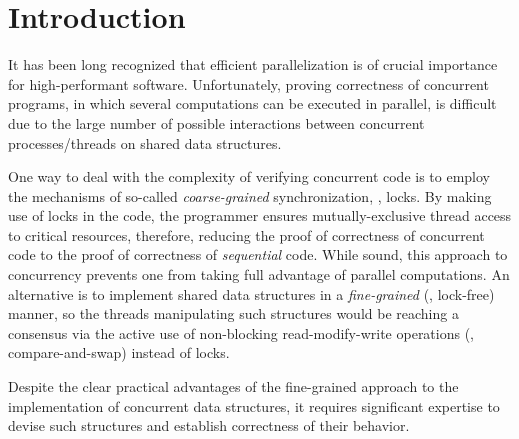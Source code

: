 \section{Introduction}
\label{sec:intro}

It has been long recognized that efficient parallelization is of
crucial importance for high-performant software. Unfortunately,
proving correctness of concurrent programs, in which several
computations can be executed in parallel, is difficult due to the
large number of possible interactions between concurrent
processes/threads on shared data structures.




One way to deal with the complexity of verifying concurrent code is to
employ the mechanisms of so-called \emph{coarse-grained}
synchronization, \ie, locks. By making use of locks in the code, the
programmer ensures mutually-exclusive thread access to critical
resources, therefore, reducing the proof of correctness of concurrent
code to the proof of correctness of \emph{sequential} code. While
sound, this approach to concurrency prevents one from taking full
advantage of parallel computations. An alternative is to implement
shared data structures in a \emph{fine-grained} (\ie, lock-free)
manner, so the threads manipulating such structures would be reaching
a consensus via the active use of non-blocking read-modify-write
operations (\eg, compare-and-swap) instead of locks.

Despite the clear practical advantages of the fine-grained approach to
the implementation of concurrent data structures, it requires
significant expertise to devise such structures and establish
correctness of their behavior.
%

